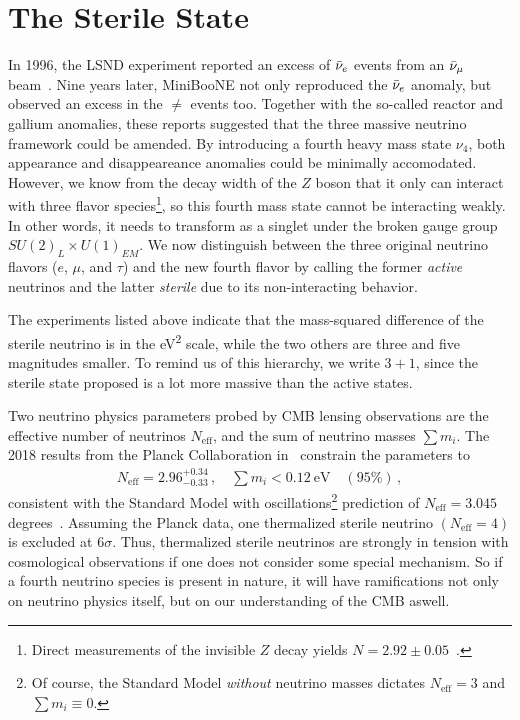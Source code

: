 %
%
\section{The Sterile State}\label{sec:anomalies}
In 1996, the LSND experiment reported an excess of $\bar{\nu}_e$ events from an $\bar{\nu}_\mu$ beam~\cite{lsnd}.  
Nine years later, MiniBooNE not only reproduced the $\bar{\nu}_e$ anomaly, but observed an excess in the
$\ne$ events too. Together with the so-called reactor and gallium anomalies, these reports suggested 
that the three massive neutrino framework could be amended.
By introducing a fourth heavy mass state $\nu_4$, both appearance and disappeareance anomalies could be minimally accomodated.
However, we know from the decay width of the $Z$ boson that it only can interact with three flavor species\footnote{
    Direct measurements of the invisible $Z$ decay yields $N=2.92 \pm 0.05$~\cite{pdg}.
}, 
so this fourth mass state cannot be interacting weakly. In other words, it needs to transform as a
singlet under the broken gauge group $SU(2)_L \times U(1)_{EM}$.
We now distinguish between the three original neutrino flavors ($e$, $\mu$, and $\tau$) and the new fourth 
flavor by calling the former \emph{active} neutrinos
and the latter \emph{sterile} due to its non-interacting behavior.

The experiments listed above indicate that the mass-squared difference of the 
sterile neutrino is in the \si{\eV\squared} scale, while the two others
are three and five magnitudes smaller. To remind us of this hierarchy, we write $3+1$, since the sterile state 
proposed is a lot more massive than the active states.


Two neutrino physics parameters probed by CMB lensing observations are the effective number of neutrinos
$N_\text{eff}$, and the sum of neutrino masses $\sum m_i$. 
The 2018 results from the Planck Collaboration in~\cite{planck2018} constrain the parameters to 
\begin{align}
    N_\text{eff} = 2.96^{+0.34}_{-0.33}\,, \quad \sum m_i < \SI{0.12}{\eV} \quad (95\%)\,,
\end{align}
consistent with the Standard Model with oscillations\footnote{Of course, the 
Standard Model \emph{without} neutrino masses dictates $N_\text{eff} = 3$ and $\sum m_i \equiv 0$.} prediction of $N_\text{eff} = 3.045$ degrees~\cite{desalas2016}.
Assuming the Planck data, one thermalized sterile neutrino $(N_\text{eff} = 4)$ is excluded at $6\sigma$. 
Thus, thermalized sterile 
neutrinos are strongly in tension with cosmological observations if one does not consider some special mechanism.
So if a fourth neutrino species is present in nature, it will have ramifications not only on neutrino physics itself, but on
our understanding of the CMB aswell.


